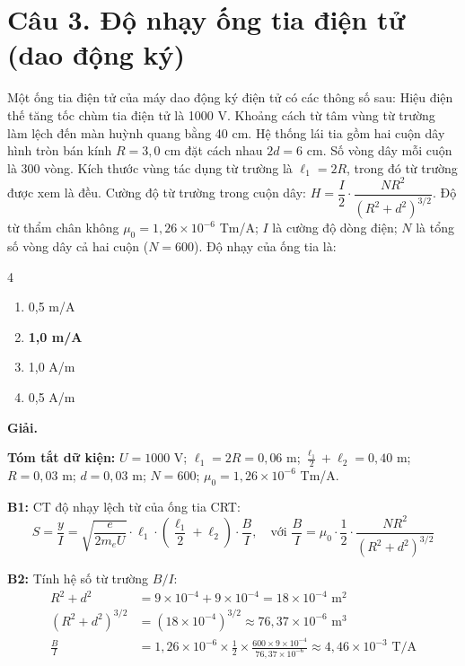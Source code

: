 \documentclass[11pt,a4paper]{article}
\begin{document}
\vspace{0.5cm}

\section*{Câu 3. Độ nhạy ống tia điện tử (dao động ký)}

Một ống tia điện tử của máy dao động ký điện tử có các thông số sau: Hiệu điện thế tăng tốc chùm tia điện tử là 1000 V. Khoảng cách từ tâm vùng từ trường làm lệch đến màn huỳnh quang bằng 40 cm. Hệ thống lái tia gồm hai cuộn dây hình tròn bán kính $R = 3{,}0$ cm đặt cách nhau $2d = 6$ cm. Số vòng dây mỗi cuộn là 300 vòng. Kích thước vùng tác dụng từ trường là $\ell_1 = 2R$, trong đó từ trường được xem là đều. Cường độ từ trường trong cuộn dây: $H = \dfrac{I}{2} \cdot \dfrac{NR^2}{(R^2 + d^2)^{3/2}}$. Độ từ thẩm chân không $\mu_0 = 1{,}26 \times 10^{-6}$ Tm/A; $I$ là cường độ dòng điện; $N$ là tổng số vòng dây cả hai cuộn ($N = 600$). Độ nhạy của ống tia là:

\begin{multicols}{4}
\begin{enumerate}[label=\Alph*., itemsep=1pt, topsep=1pt, parsep=0pt, leftmargin=1.8em]
    \item 0,5 m/A
    \item \textbf{1,0 m/A}
    \item 1,0 A/m
    \item 0,5 A/m
\end{enumerate}
\end{multicols}

\textbf{Giải.}

\textbf{Tóm tắt dữ kiện:} $U = 1000$ V; $\ell_1 = 2R = 0{,}06$ m; $\frac{\ell_1}{2} + \ell_2 = 0{,}40$ m; $R = 0{,}03$ m; $d = 0{,}03$ m; $N = 600$; $\mu_0 = 1{,}26 \times 10^{-6}$ Tm/A.

\textbf{B1:} CT độ nhạy lệch từ của ống tia CRT:
\begin{equation*}
    S = \frac{y}{I} = \sqrt{\frac{e}{2m_e U}} \cdot \ell_1 \cdot \left(\frac{\ell_1}{2} + \ell_2\right) \cdot \frac{B}{I}, \quad \text{với } \frac{B}{I} = \mu_0 \cdot \frac{1}{2} \cdot \frac{NR^2}{(R^2 + d^2)^{3/2}}
\end{equation*}

\textbf{B2:} Tính hệ số từ trường $B/I$:
\begin{align*}
    R^2 + d^2 &= 9 \times 10^{-4} + 9 \times 10^{-4} = 18 \times 10^{-4} \text{ m}^2 \\
    (R^2 + d^2)^{3/2} &= (18 \times 10^{-4})^{3/2} \approx 76{,}37 \times 10^{-6} \text{ m}^3 \\
    \frac{B}{I} &= 1{,}26 \times 10^{-6} \times \frac{1}{2} \times \frac{600 \times 9 \times 10^{-4}}{76{,}37 \times 10^{-6}} \approx 4{,}46 \times 10^{-3} \text{ T/A}
\end{align*}
\end{document}
